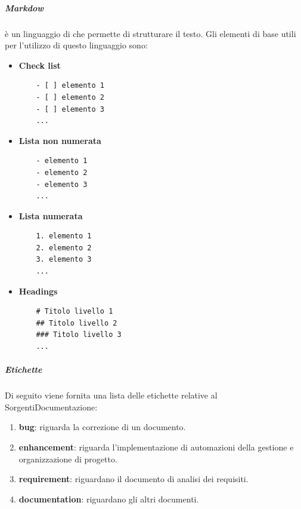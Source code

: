 \subparagraph{Markdow}
\label{subpar:markdown}
 è un linguaggio di  che permette di strutturare il testo.
Gli elementi di base utili per l'utilizzo di questo linguaggio sono:
\begin{itemize}
    \item \textbf{Check list}
    \begin{lstlisting}
    - [ ] elemento 1
    - [ ] elemento 2
    - [ ] elemento 3
    ...
    \end{lstlisting}

    \item \textbf{Lista non numerata}
    \begin{lstlisting}
    - elemento 1
    - elemento 2
    - elemento 3
    ...
    \end{lstlisting}

    \item \textbf{Lista numerata}
    \begin{lstlisting}
    1. elemento 1
    2. elemento 2
    3. elemento 3
    ...
    \end{lstlisting}

    \item \textbf{Headings}
    \begin{lstlisting}
    # Titolo livello 1
    ## Titolo livello 2
    ### Titolo livello 3
    ...
    \end{lstlisting}
    
\end{itemize}

\subparagraph{Etichette}
Di seguito viene fornita una lista delle etichette relative al  SorgentiDocumentazione:
\begin{enumerate}
    \item \textbf{bug}: riguarda la correzione di un documento.
    \item \textbf{enhancement}: riguarda l'implementazione di automazioni della gestione e organizzazione di progetto.
    \item \textbf{requirement}: riguardano il documento di analisi dei requisiti.
    \item \textbf{documentation}: riguardano gli altri documenti.
\end{enumerate}

